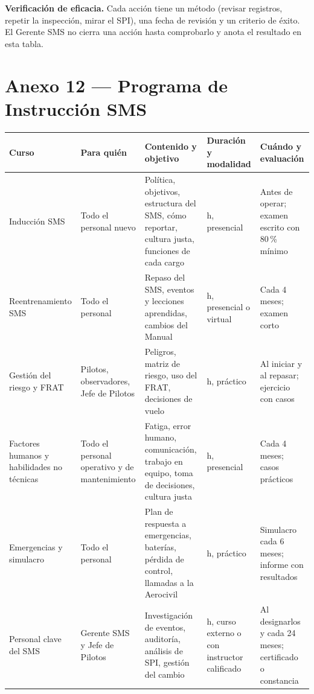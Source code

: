 \textbf{Verificación de eficacia.} Cada acción tiene un método (revisar registros, repetir la inspección, mirar el SPI), una fecha de revisión y un criterio de éxito. El Gerente SMS no cierra una acción hasta comprobarlo y anota el resultado en esta tabla.

\clearpage
\section*{Anexo 12 --- Programa de Instrucción SMS}
\begin{longtable}{|>{\RaggedRight\arraybackslash}p{3cm}|>{\RaggedRight\arraybackslash}p{2.8cm}|>{\RaggedRight\arraybackslash}p{4.2cm}|>{\RaggedRight\arraybackslash}p{1.9cm}|>{\RaggedRight\arraybackslash}p{3.1cm}|}
\hline
\rowcolor[gray]{0.9}\textbf{Curso} & \textbf{Para quién} & \textbf{Contenido y objetivo} & \textbf{Duración y modalidad} & \textbf{Cuándo y evaluación} \\ \hline
\endhead
Inducción SMS & Todo el personal nuevo & Política, objetivos, estructura del SMS, cómo reportar, cultura justa, funciones de cada cargo & 3 h, presencial & Antes de operar; examen escrito con 80\,\% mínimo \\ \hline
Reentrenamiento SMS & Todo el personal & Repaso del SMS, eventos y lecciones aprendidas, cambios del Manual & 2 h, presencial o virtual & Cada 4 meses; examen corto \\ \hline
Gestión del riesgo y FRAT & Pilotos, observadores, Jefe de Pilotos & Peligros, matriz de riesgo, uso del FRAT, decisiones de vuelo & 2 h, práctico & Al iniciar y al repasar; ejercicio con casos \\ \hline
Factores humanos y habilidades no técnicas & Todo el personal operativo y de mantenimiento & Fatiga, error humano, comunicación, trabajo en equipo, toma de decisiones, cultura justa & 2 h, presencial & Cada 4 meses; casos prácticos \\ \hline
Emergencias y simulacro & Todo el personal & Plan de respuesta a emergencias, baterías, pérdida de control, llamadas a la Aerocivil & 2 h, práctico & Simulacro cada 6 meses; informe con resultados \\ \hline
Personal clave del SMS & Gerente SMS y Jefe de Pilotos & Investigación de eventos, auditoría, análisis de SPI, gestión del cambio & 8 h, curso externo o con instructor calificado & Al designarlos y cada 24 meses; certificado o constancia \\ \hline
\end{longtable}

